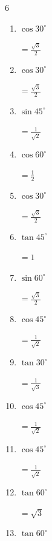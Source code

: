 \begin{multicols}{6}
\begin{enumerate}
        $\displaystyle =1$

  \item $\displaystyle \cos{30^\circ}$

        $\displaystyle =\frac{\sqrt{3}}{2}$

  \item $\displaystyle \cos{30^\circ}$

        $\displaystyle =\frac{\sqrt{3}}{2}$

  \item $\displaystyle \sin{45^\circ}$

        $\displaystyle =\frac{1}{\sqrt{2}}$

\columnbreak %

  \item $\displaystyle \cos{60^\circ}$

        $\displaystyle =\frac{1}{2}$

  \item $\displaystyle \cos{30^\circ}$

        $\displaystyle =\frac{\sqrt{3}}{2}$

  \item $\displaystyle \tan{45^\circ}$

        $\displaystyle =1$

  \item $\displaystyle \sin{60^\circ}$

        $\displaystyle =\frac{\sqrt{3}}{2}$

  \item $\displaystyle \cos{45^\circ}$

        $\displaystyle =\frac{1}{\sqrt{2}}$

  \item $\displaystyle \tan{30^\circ}$

        $\displaystyle =\frac{1}{\sqrt{3}}$

  \item $\displaystyle \cos{45^\circ}$

        $\displaystyle =\frac{1}{\sqrt{2}}$

  \item $\displaystyle \cos{45^\circ}$

        $\displaystyle =\frac{1}{\sqrt{2}}$

  \item $\displaystyle \tan{60^\circ}$

        $\displaystyle =\sqrt{3}$

  \item $\displaystyle \tan{60^\circ}$


\end{enumerate}
\end{multicols}
